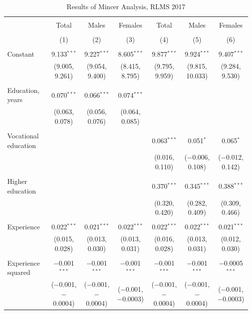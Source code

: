 \documentclass[12pt,a4paper]{article}
\numberwithin{equation}{section}
\begin{document}
\begin{landscape}
	
	\fontsize{9}{11}
	\selectfont
	
	\begin{table}[!htbp] \centering 
		\caption{Results of Mincer Analysis, RLMS 2017} 
		\label{} 
		\begin{tabular}{@{\extracolsep{5pt}}lcccccc} 
			\\[-1.8ex]\hline 
			\hline \\[-1.8ex] 
			& Total & Males & Females & Total & Males & Females \\ 
			\\[-1.8ex] & (1) & (2) & (3) & (4) & (5) & (6)\\ 
			\hline \\[-1.8ex] 
			Constant & 9.133$^{***}$ & 9.227$^{***}$ & 8.605$^{***}$ & 9.877$^{***}$ & 9.924$^{***}$ & 9.407$^{***}$ \\ 
			& (9.005, 9.261) & (9.054, 9.400) & (8.415, 8.795) & (9.795, 9.959) & (9.815, 10.033) & (9.284, 9.530) \\ 
			& & & & & & \\ 
			Education, years & 0.070$^{***}$ & 0.066$^{***}$ & 0.074$^{***}$ &  &  &  \\ 
			& (0.063, 0.078) & (0.056, 0.076) & (0.064, 0.085) &  &  &  \\ 
			& & & & & & \\ 
			Vocational education &  &  &  & 0.063$^{***}$ & 0.051$^{*}$ & 0.065$^{*}$ \\ 
			&  &  &  & (0.016, 0.110) & ($-$0.006, 0.108) & ($-$0.012, 0.142) \\ 
			& & & & & & \\ 
			Higher education &  &  &  & 0.370$^{***}$ & 0.345$^{***}$ & 0.388$^{***}$ \\ 
			&  &  &  & (0.320, 0.420) & (0.282, 0.409) & (0.309, 0.466) \\ 
			& & & & & & \\ 
			Experience & 0.022$^{***}$ & 0.021$^{***}$ & 0.022$^{***}$ & 0.022$^{***}$ & 0.022$^{***}$ & 0.021$^{***}$ \\ 
			& (0.015, 0.028) & (0.013, 0.030) & (0.013, 0.031) & (0.016, 0.028) & (0.013, 0.031) & (0.012, 0.030) \\ 
			& & & & & & \\ 
			Experience squared & $-$0.001$^{***}$ & $-$0.001$^{***}$ & $-$0.001$^{***}$ & $-$0.001$^{***}$ & $-$0.001$^{***}$ & $-$0.0005$^{***}$ \\ 
			& ($-$0.001, $-$0.0004) & ($-$0.001, $-$0.0004) & ($-$0.001, $-$0.0003) & ($-$0.001, $-$0.0004) & ($-$0.001, $-$0.0004) & ($-$0.001, $-$0.0003) \\ 

\end{tabular}
\end{table}
\end{landscape}
\end{document}
